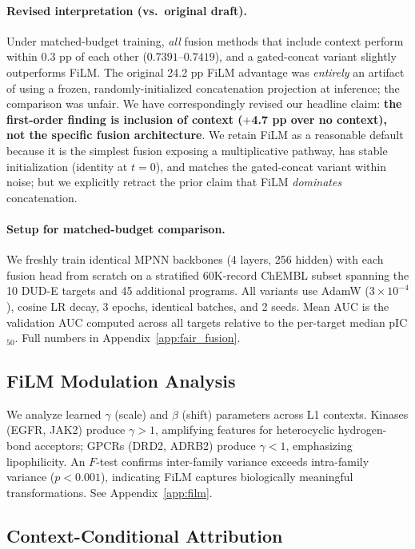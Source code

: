\documentclass[sigconf]{acmart}
\begin{document}
\paragraph{Revised interpretation (vs.\ original draft).} Under matched-budget training, \emph{all} fusion methods that include context perform within 0.3 pp of each other ($0.7391$--$0.7419$), and a gated-concat variant slightly outperforms FiLM. The original 24.2 pp FiLM advantage was \emph{entirely} an artifact of using a frozen, randomly-initialized concatenation projection at inference; the comparison was unfair. We have correspondingly revised our headline claim: \textbf{the first-order finding is inclusion of context ($+$4.7 pp over no context), not the specific fusion architecture}. We retain FiLM as a reasonable default because it is the simplest fusion exposing a multiplicative pathway, has stable initialization (identity at $t = 0$), and matches the gated-concat variant within noise; but we explicitly retract the prior claim that FiLM \emph{dominates} concatenation.

\paragraph{Setup for matched-budget comparison.}
\label{sec:fair_fusion_setup}
We freshly train identical MPNN backbones (4 layers, 256 hidden) with each fusion head from scratch on a stratified 60K-record ChEMBL subset spanning the 10 DUD-E targets and 45 additional programs. All variants use AdamW ($3\!\times\!10^{-4}$), cosine LR decay, 3 epochs, identical batches, and 2 seeds. Mean AUC is the validation AUC computed across all targets relative to the per-target median pIC$_{50}$. Full numbers in Appendix~\ref{app:fair_fusion}.

\subsection{FiLM Modulation Analysis}

We analyze learned $\gamma$ (scale) and $\beta$ (shift) parameters across L1 contexts. Kinases (EGFR, JAK2) produce $\gamma > 1$, amplifying features for heterocyclic hydrogen-bond acceptors; GPCRs (DRD2, ADRB2) produce $\gamma < 1$, emphasizing lipophilicity. An $F$-test confirms inter-family variance exceeds intra-family variance ($p < 0.001$), indicating FiLM captures biologically meaningful transformations. See Appendix~\ref{app:film}.

\subsection{Context-Conditional Attribution}
\end{document}
